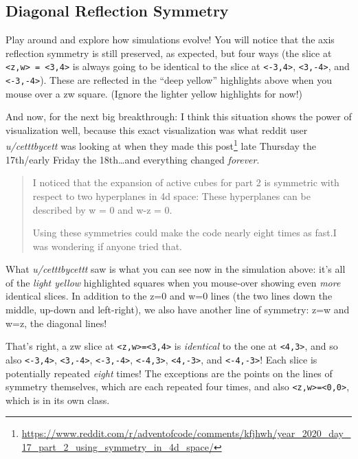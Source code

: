 \documentclass[]{article}
\renewcommand{\href}[2]{#2\footnote{\url{#1}}}
\begin{document}
\hypertarget{diagonal-reflection-symmetry}{%
\subsection{Diagonal Reflection Symmetry}\label{diagonal-reflection-symmetry}}

Play around and explore how simulations evolve! You will notice that the axis
reflection symmetry is still preserved, as expected, but four ways (the slice at
\texttt{\textless{}z,w\textgreater{}\ =\ \textless{}3,4\textgreater{}} is always
going to be identical to the slice at \texttt{\textless{}-3,4\textgreater{}},
\texttt{\textless{}3,-4\textgreater{}}, and
\texttt{\textless{}-3,-4\textgreater{}}). These are reflected in the ``deep
yellow'' highlights above when you mouse over a zw square. (Ignore the lighter
yellow highlights for now!)

And now, for the next big breakthrough: I think this situation shows the power
of visualization well, because this exact visualization was what reddit user
\emph{u/cetttbycett} was looking at when
\href{https://www.reddit.com/r/adventofcode/comments/kfjhwh/year_2020_day_17_part_2_using_symmetry_in_4d_space/}{they
made this post} late Thursday the 17th/early Friday the 18th\ldots and
everything changed \emph{forever}.

\begin{quote}
I noticed that the expansion of active cubes for part 2 is symmetric with
respect to two hyperplanes in 4d space: These hyperplanes can be described by w
= 0 and w-z = 0.

Using these symmetries could make the code nearly eight times as fast.I was
wondering if anyone tried that.
\end{quote}

What \emph{u/cetttbycettt} saw is what you can see now in the simulation above:
it's all of the \emph{light yellow} highlighted squares when you mouse-over
showing even \emph{more} identical slices. In addition to the z=0 and w=0 lines
(the two lines down the middle, up-down and left-right), we also have another
line of symmetry: z=w and w=z, the diagonal lines!

That's right, a zw slice at
\texttt{\textless{}z,w\textgreater{}=\textless{}3,4\textgreater{}} is
\emph{identical} to the one at \texttt{\textless{}4,3\textgreater{}}, and so
also \texttt{\textless{}-3,4\textgreater{}},
\texttt{\textless{}3,-4\textgreater{}}, \texttt{\textless{}-3,-4\textgreater{}},
\texttt{\textless{}-4,3\textgreater{}}, \texttt{\textless{}4,-3\textgreater{}},
and \texttt{\textless{}-4,-3\textgreater{}}! Each slice is potentially repeated
\emph{eight} times! The exceptions are the points on the lines of symmetry
themselves, which are each repeated four times, and also
\texttt{\textless{}z,w\textgreater{}=\textless{}0,0\textgreater{}}, which is in
its own class.
\end{document}
